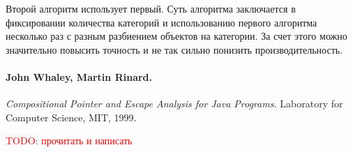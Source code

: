\documentclass[12pt]{article}
\newcommand{\eng}[1]{{\English#1}}
\newcommand{\todo}[1]{\textcolor{red}{TODO: #1}}
\begin{document}
      Второй алгоритм использует первый. Суть алгоритма заключается в
      фиксировании количества категорий и использованию первого алгоритма
      несколько раз с разным разбиением объектов на категории. За счет этого
      можно значительно повысить точность и не так сильно понизить
      производительность.

    \paragraph{John Whaley, Martin Rinard.}
      \eng{
        \textit{Compositional Pointer and Escape Analysis for Java Programs.}
        Laboratory for Computer Science, MIT,
        1999.
      }

      \todo{прочитать и написать}
\end{document}
